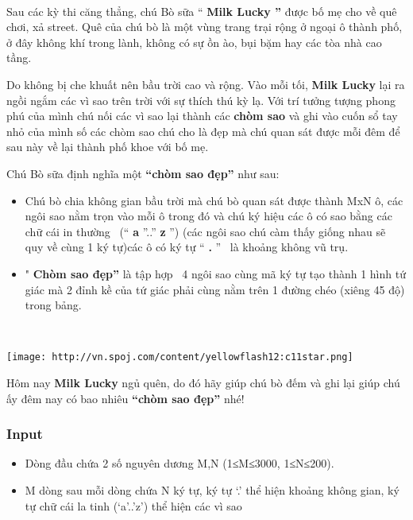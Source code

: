 

 

Sau các kỳ thi căng thẳng, chú Bò sữa “ \textbf{ Milk Lucky ” } được bố mẹ cho về quê chơi, xả street. Quê của chú bò là một vùng trang trại rộng ở ngoại ô thành phố, ở đây không khí trong lành, không có sự ồn ào, bụi bặm hay các tòa nhà cao tầng.

Do không bị che khuất nên bầu trời cao và rộng. Vào mỗi tối, \textbf{ Milk Lucky } lại ra ngồi ngắm các vì sao trên trời với sự thích thú kỳ lạ. Với trí tưởng tượng phong phú của mình chú nối các vì sao lại thành các \textbf{ chòm sao } và ghi vào cuốn sổ tay nhỏ của mình số các chòm sao chú cho là đẹp mà chú quan sát được mỗi đêm để sau này về lại thành phố khoe với bố mẹ.

Chú Bò sữa định nghĩa một \textbf{“chòm sao đẹp”} như sau:
\begin{itemize}
	\item Chú bò chia không gian bầu trời mà chú bò quan sát được thành MxN ô, các ngôi sao nằm trọn vào mỗi ô trong đó và chú ký hiệu các ô có sao bằng các chữ cái in thường  (“ \textbf{ a } ”..” \textbf{ z } ”) (các ngôi sao chú càm thấy giống nhau sẽ quy về cùng 1 ký tự)các ô có ký tự “ \textbf{ . } ”  là khoảng không vũ trụ.
	\item " \textbf{Chòm sao đẹp”} là tập hợp  4 ngôi sao cùng mã ký tự tạo thành 1 hình tứ giác mà 2 đỉnh kề của tứ giác phải cùng nằm trên 1 đường chéo (xiêng 45 độ) trong bảng.
\end{itemize}

 


\texttt{[image: http://vn.spoj.com/content/yellowflash12:c11star.png]}

Hôm nay \textbf{Milk Lucky} ngủ quên, do đó hãy giúp chú bò đếm và ghi lại giúp chú ấy đêm nay có bao nhiêu \textbf{“chòm sao đẹp”} nhé!
\begin{itemize}
\end{itemize}

\subsubsection{Input}
\begin{itemize}
	\item Dòng đầu chứa 2 số nguyên dương M,N (1≤M≤3000, 1≤N≤200).
	\item M dòng sau mỗi dòng chứa N ký tự, ký tự ‘.’ thể hiện khoảng không gian, ký tự chữ cái la tinh (‘a’..’z’) thể hiện các vì sao
\end{itemize}

